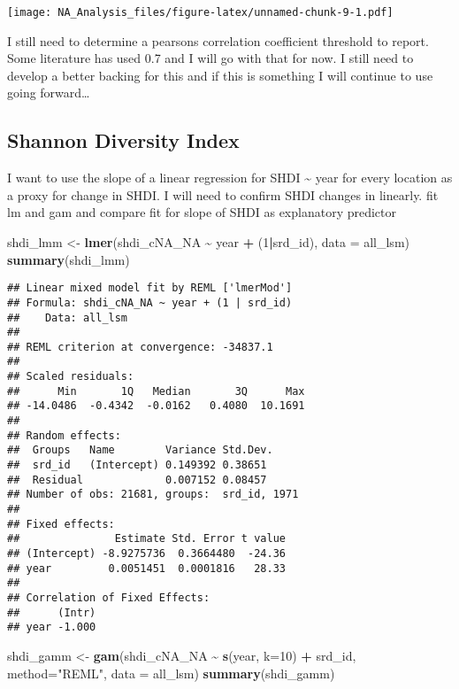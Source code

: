 \documentclass[
]{article}
\newenvironment{Shaded}{\begin{snugshade}}{\end{snugshade}}
\newcommand{\AttributeTok}[1]{\textcolor[rgb]{0.13,0.29,0.53}{#1}}
\newcommand{\DecValTok}[1]{\textcolor[rgb]{0.00,0.00,0.81}{#1}}
\newcommand{\FunctionTok}[1]{\textcolor[rgb]{0.13,0.29,0.53}{\textbf{#1}}}
\newcommand{\NormalTok}[1]{#1}
\newcommand{\OtherTok}[1]{\textcolor[rgb]{0.56,0.35,0.01}{#1}}
\newcommand{\SpecialCharTok}[1]{\textcolor[rgb]{0.81,0.36,0.00}{\textbf{#1}}}
\newcommand{\StringTok}[1]{\textcolor[rgb]{0.31,0.60,0.02}{#1}}
\begin{document}
\texttt{[image: NA\_Analysis\_files/figure-latex/unnamed-chunk-9-1.pdf]}

I still need to determine a pearsons correlation coefficient threshold
to report. Some literature has used 0.7 and I will go with that for now.
I still need to develop a better backing for this and if this is
something I will continue to use going forward\ldots{}

\subsection{Shannon Diversity Index}\label{shannon-diversity-index}

I want to use the slope of a linear regression for SHDI
\textasciitilde{} year for every location as a proxy for change in SHDI.
I will need to confirm SHDI changes in linearly. fit lm and gam and
compare fit for slope of SHDI as explanatory predictor

\begin{Shaded}
\begin{Highlighting}[]
\NormalTok{shdi\_lmm }\OtherTok{\textless{}{-}} \FunctionTok{lmer}\NormalTok{(shdi\_cNA\_NA }\SpecialCharTok{\textasciitilde{}}\NormalTok{ year }\SpecialCharTok{+}\NormalTok{ (}\DecValTok{1}\SpecialCharTok{|}\NormalTok{srd\_id), }\AttributeTok{data =}\NormalTok{ all\_lsm)}
\FunctionTok{summary}\NormalTok{(shdi\_lmm)}
\end{Highlighting}
\end{Shaded}

\begin{verbatim}
## Linear mixed model fit by REML ['lmerMod']
## Formula: shdi_cNA_NA ~ year + (1 | srd_id)
##    Data: all_lsm
## 
## REML criterion at convergence: -34837.1
## 
## Scaled residuals: 
##      Min       1Q   Median       3Q      Max 
## -14.0486  -0.4342  -0.0162   0.4080  10.1691 
## 
## Random effects:
##  Groups   Name        Variance Std.Dev.
##  srd_id   (Intercept) 0.149392 0.38651 
##  Residual             0.007152 0.08457 
## Number of obs: 21681, groups:  srd_id, 1971
## 
## Fixed effects:
##               Estimate Std. Error t value
## (Intercept) -8.9275736  0.3664480  -24.36
## year         0.0051451  0.0001816   28.33
## 
## Correlation of Fixed Effects:
##      (Intr)
## year -1.000
\end{verbatim}

\begin{Shaded}
\begin{Highlighting}[]
\NormalTok{shdi\_gamm }\OtherTok{\textless{}{-}} \FunctionTok{gam}\NormalTok{(shdi\_cNA\_NA }\SpecialCharTok{\textasciitilde{}} \FunctionTok{s}\NormalTok{(year, }\AttributeTok{k=}\DecValTok{10}\NormalTok{) }\SpecialCharTok{+}\NormalTok{ srd\_id, }\AttributeTok{method=}\StringTok{"REML"}\NormalTok{, }\AttributeTok{data =}\NormalTok{ all\_lsm)}
\FunctionTok{summary}\NormalTok{(shdi\_gamm)}
\end{Highlighting}
\end{Shaded}
\end{document}
